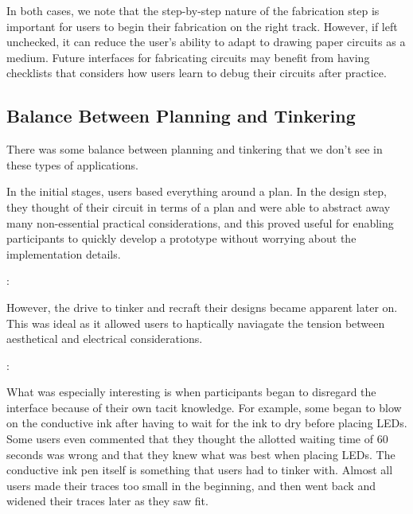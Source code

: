 \documentclass{sigchi}
\begin{document}
  In both cases, we note that the step-by-step nature of the fabrication step is important for users to begin their fabrication on the right track. However, if left unchecked, it can reduce the user's ability to adapt to drawing paper circuits as a medium. Future interfaces for fabricating circuits may benefit from having checklists that considers how users learn to debug their circuits after practice.

  \subsection{Balance Between Planning and Tinkering}
  There was some balance between planning and tinkering that we don't see in these types of applications.
  
  In the initial stages, users based everything around a plan. In the design step, they thought of their circuit in terms of a plan and were able to abstract away many non-essential practical considerations, and this proved useful for enabling participants to quickly develop a prototype without worrying about the implementation details.
  
  \begin{myquote}
   \vspace{-2pt}
    :
    \vspace{-2pt}
  \end{myquote}
  
  However, the drive to tinker and recraft their designs became apparent later on. This was ideal as it allowed users to haptically naviagate the tension between aesthetical and electrical considerations.
  
  \begin{myquote}
   \vspace{-2pt}
    :
    \vspace{-2pt}
  \end{myquote}
  
  What was especially interesting is when participants began to disregard the interface because of their own tacit knowledge. For example, some began to blow on the conductive ink after having to wait for the ink to dry before placing LEDs. Some users even commented that they thought the allotted waiting time of 60 seconds was wrong and that they knew what was best when placing LEDs. The conductive ink pen itself is something that users had to tinker with. Almost all users made their traces too small in the beginning, and then went back and widened their traces later as they saw fit.
  
\end{document}
